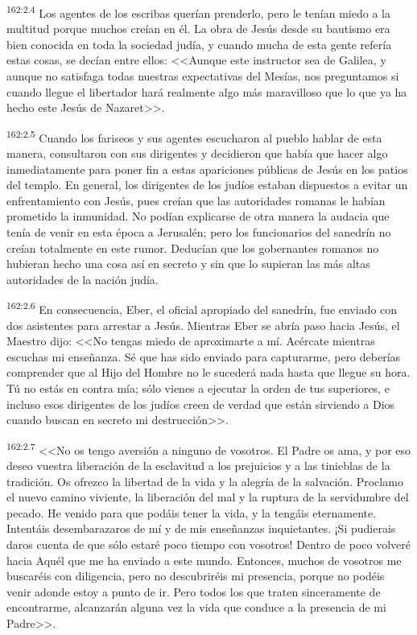 \par 
\textsuperscript{162:2.4} Los agentes de los escribas querían prenderlo, pero le tenían miedo a la multitud porque muchos creían en él. La obra de Jesús desde su bautismo era bien conocida en toda la sociedad judía, y cuando mucha de esta gente refería estas cosas, se decían entre ellos: <<Aunque este instructor sea de Galilea, y aunque no satisfaga todas nuestras expectativas del Mesías, nos preguntamos si cuando llegue el libertador hará realmente algo más maravilloso que lo que ya ha hecho este Jesús de Nazaret>>.

\par 
\textsuperscript{162:2.5} Cuando los fariseos y sus agentes escucharon al pueblo hablar de esta manera, consultaron con sus dirigentes y decidieron que había que hacer algo inmediatamente para poner fin a estas apariciones públicas de Jesús en los patios del templo. En general, los dirigentes de los judíos estaban dispuestos a evitar un enfrentamiento con Jesús, pues creían que las autoridades romanas le habían prometido la inmunidad. No podían explicarse de otra manera la audacia que tenía de venir en esta época a Jerusalén; pero los funcionarios del sanedrín no creían totalmente en este rumor. Deducían que los gobernantes romanos no hubieran hecho una cosa así en secreto y sin que lo supieran las más altas autoridades de la nación judía.

\par 
\textsuperscript{162:2.6} En consecuencia, Eber, el oficial apropiado del sanedrín, fue enviado con dos asistentes para arrestar a Jesús. Mientras Eber se abría paso hacia Jesús, el Maestro dijo: <<No tengas miedo de aproximarte a mí. Acércate mientras escuchas mi enseñanza. Sé que has sido enviado para capturarme, pero deberías comprender que al Hijo del Hombre no le sucederá nada hasta que llegue su hora. Tú no estás en contra mía; sólo vienes a ejecutar la orden de tus superiores, e incluso esos dirigentes de los judíos creen de verdad que están sirviendo a Dios cuando buscan en secreto mi destrucción>>.

\par 
\textsuperscript{162:2.7} <<No os tengo aversión a ninguno de vosotros. El Padre os ama, y por eso deseo vuestra liberación de la esclavitud a los prejuicios y a las tinieblas de la tradición. Os ofrezco la libertad de la vida y la alegría de la salvación. Proclamo el nuevo camino viviente, la liberación del mal y la ruptura de la servidumbre del pecado. He venido para que podáis tener la vida, y la tengáis eternamente. Intentáis desembarazaros de mí y de mis enseñanzas inquietantes. ¡Si pudierais daros cuenta de que sólo estaré poco tiempo con vosotros! Dentro de poco volveré hacia Aquél que me ha enviado a este mundo. Entonces, muchos de vosotros me buscaréis con diligencia, pero no descubriréis mi presencia, porque no podéis venir adonde estoy a punto de ir. Pero todos los que traten sinceramente de encontrarme, alcanzarán alguna vez la vida que conduce a la presencia de mi Padre>>.

